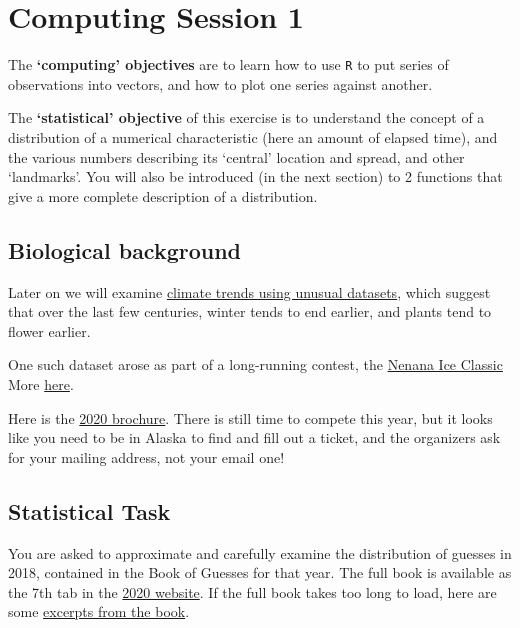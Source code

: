 \documentclass[]{book}
\begin{document}
\hypertarget{computing01}{%
\chapter{Computing Session 1}\label{computing01}}

The \textbf{`computing' objectives} are to learn how to use \texttt{R} to put series of observations into vectors, and how to plot one series against another.

The \textbf{`statistical' objective} of this exercise is to understand the concept of a distribution of a numerical characteristic (here an amount of elapsed time), and the various numbers describing its `central' location and spread, and other `landmarks'. You will also be introduced (in the next section) to 2 functions that give a more complete description of a distribution.

\hypertarget{biological-background}{%
\section{Biological background}\label{biological-background}}

Later on we will examine \href{http://www.medicine.mcgill.ca/epidemiology/hanley/c678/index.html\#anthropometricData}{climate trends using unusual datasets}, which suggest that over the last few centuries, winter tends to end earlier, and plants tend to flower earlier.

One such dataset arose as part of a long-running contest, the \href{http://www.nenanaakiceclassic.com}{Nenana Ice Classic}
More \href{http://www.john-daly.com/nenana.htm}{here}.

Here is the \href{http://www.medicine.mcgill.ca/epidemiology/hanley/bios691/Nenana2020Brochure.pdf}{2020 brochure}. There is still time to compete this year, but it looks like you need to be in Alaska to find and fill out a ticket, and the organizers ask for your mailing address, not your email one!

\hypertarget{statistical-task}{%
\section{Statistical Task}\label{statistical-task}}

You are asked to approximate and carefully examine the distribution of guesses in 2018, contained in the Book of Guesses for that year. The full book is available as the 7th tab in the \href{http://www.nenanaakiceclassic.com}{2020 website}. If the full book takes too long to load, here are some
\href{http://www.medicine.mcgill.ca/epidemiology/hanley/bios691/SampledPages.pdf}{excerpts from the book}.
\end{document}
